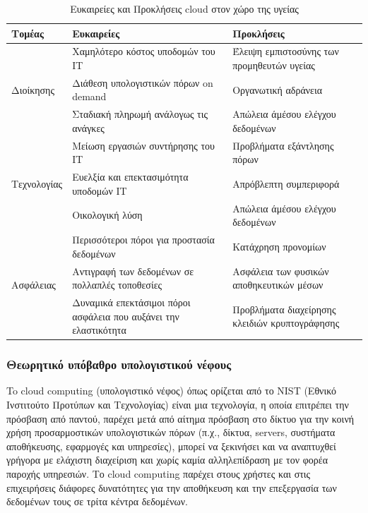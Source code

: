 \begin{table}[H]
	\begin{center}
	    \begin{tabular}{|l| p{} | p{} |}
	    \hline
	    \rowcolor{grayy}
	    \textbf{Τομέας} & \textbf{Ευκαιρείες} & \textbf{Προκλήσεις}
	    \\ \hline    
	    \multirow{3}{*}{Διοίκησης} & Χαμηλότερο κόστος υποδομών του IT & Έλειψη εμπιστοσύνης των προμηθευτών υγείας \\
	    & Διάθεση υπολογιστικών πόρων on demand & Οργανωτική αδράνεια \\
	    & Σταδιακή πληρωμή ανάλογως τις ανάγκες & Απώλεια άμέσου ελέγχου δεδομένων \\ \hline
	    \multirow{3}{*}{Τεχνολογίας} & Μείωση εργασιών συντήρησης του ΙΤ & Προβλήματα εξάντλησης πόρων \\
	    & Ευελξία και επεκτασιμότητα υποδομών IT & Απρόβλεπτη συμπεριφορά \\
	    & Οικολογική λύση & Απώλεια άμέσου ελέγχου δεδομένων  \\ \hline
	    \multirow{3}{*}{Ασφάλειας} & Περισσότεροι πόροι για προστασία δεδομένων & Κατάχρηση προνομίων \\
	    & Αντιγραφή των δεδομένων σε πολλαπλές τοποθεσίες & Ασφάλεια των φυσικών αποθηκευτικών μέσων \\
	    & Δυναμικά επεκτάσιμοι πόροι ασφάλεια που αυξάνει την ελαστικότητα & Προβλήματα διαχείρησης κλειδιών κρυπτογράφησης \\ \hline
	    \end{tabular}
	    \caption{Ευκαιρείες και Προκλήσεις cloud στον χώρο της υγείας}
	    \label{tab:health_cloud_challenges_opportunities}
	\end{center}
\end{table}	
	\subsubsection{Θεωρητικό υπόβαθρο υπολογιστικού νέφους}
	To cloud computing (υπολογιστικό νέφος) όπως ορίζεται από το NIST (Εθνικό Ινστιτούτο Προτύπων και Τεχνολογίας)  είναι μια τεχνολογία, η οποία επιτρέπει την πρόσβαση από παντού, παρέχει μετά από αίτημα πρόσβαση στο δίκτυο για την κοινή χρήση προσαρμοστικών υπολογιστικών πόρων (π.χ., δίκτυα, servers, συστήματα αποθήκευσης, εφαρμογές και υπηρεσίες), μπορεί να ξεκινήσει και να αναπτυχθεί γρήγορα με ελάχιστη διαχείριση και χωρίς καμία αλληλεπίδραση με τον φορέα παροχής υπηρεσιών. \cite{cloudComputing} Το cloud computing παρέχει στους χρήστες και στις επιχειρήσεις διάφορες δυνατότητες για την αποθήκευση και την επεξεργασία των δεδομένων τους σε τρίτα κέντρα δεδομένων. \cite{Haghighat2015}
	
